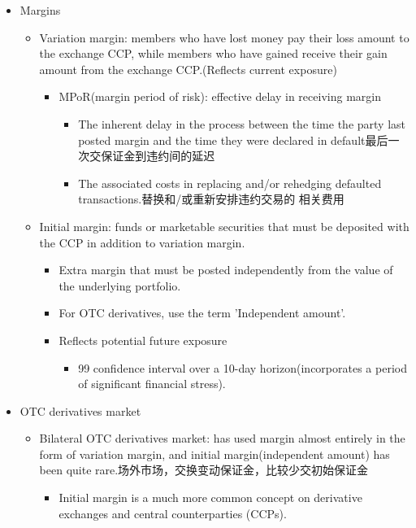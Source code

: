 \begin{itemize}
\item Margins
\begin{itemize}
    \item Variation margin: members who have lost money pay their loss amount to the exchange CCP, while members who have gained receive their gain amount from the exchange CCP.(Reflects current exposure)
    \begin{itemize}
        \item MPoR(margin period of risk): effective delay in receiving margin
        \begin{itemize}
        \item The inherent delay in the process between the time the party last posted margin and the time they were declared in default最后一次交保证金到违约间的延迟
        \item The associated costs in replacing and/or rehedging defaulted transactions.替换和/或重新安排违约交易的 相关费用
        \end{itemize}
    \end{itemize}
\item Initial margin: funds or marketable securities that must be deposited with the CCP in addition to variation margin.
\begin{itemize}
    \item Extra margin that must be posted independently from the value of the underlying portfolio.
    \item For OTC derivatives, use the term 'Independent amount'.
    \item Reflects potential future exposure
    \begin{itemize}
    \item 99 confidence interval over a 10-day horizon(incorporates a period of significant financial stress).
    \end{itemize}
\end{itemize}
\end{itemize}
\item OTC derivatives market
\begin{itemize}
    \item Bilateral OTC derivatives market: has used margin almost entirely in the form of variation margin, and initial margin(independent amount) has been quite rare.场外市场，交换变动保证金，比较少交初始保证金
\begin{itemize}
    \item Initial margin is a much more common concept on
    derivative exchanges and central counterparties (CCPs).

\end{itemize}
\end{itemize}
\end{itemize}

